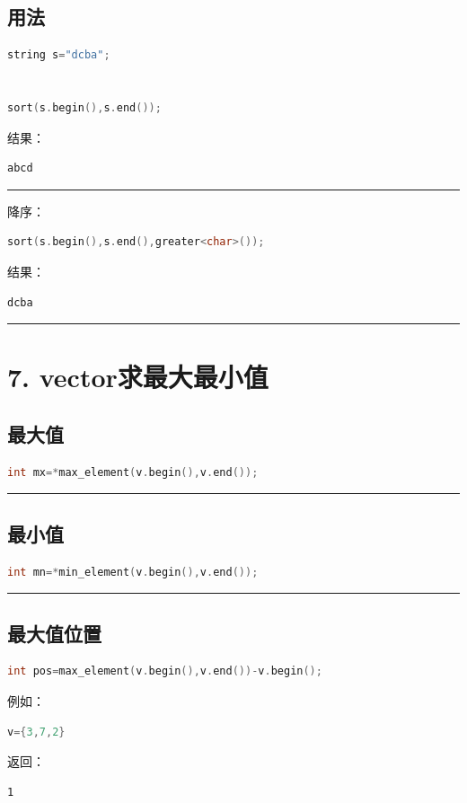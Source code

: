 \documentclass[10pt,twocolumn]{extarticle}
\begin{document}
\subsection{用法}
\begin{lstlisting}[language=C++]
string s="dcba";


sort(s.begin(),s.end());
\end{lstlisting}
结果：
\begin{lstlisting}
abcd
\end{lstlisting}

\noindent\rule{\linewidth}{0.4pt}

降序：
\begin{lstlisting}[language=C++]
sort(s.begin(),s.end(),greater<char>());
\end{lstlisting}
结果：
\begin{lstlisting}
dcba
\end{lstlisting}

\noindent\rule{\linewidth}{0.4pt}

\section{7. vector求最大最小值}

\subsection{最大值}
\begin{lstlisting}[language=C++]
int mx=*max_element(v.begin(),v.end());
\end{lstlisting}

\noindent\rule{\linewidth}{0.4pt}

\subsection{最小值}
\begin{lstlisting}[language=C++]
int mn=*min_element(v.begin(),v.end());
\end{lstlisting}

\noindent\rule{\linewidth}{0.4pt}

\subsection{最大值位置}
\begin{lstlisting}[language=C++]
int pos=max_element(v.begin(),v.end())-v.begin();
\end{lstlisting}
例如：
\begin{lstlisting}[language=C++]
v={3,7,2}
\end{lstlisting}
返回：
\begin{lstlisting}
1
\end{lstlisting}
\end{document}
